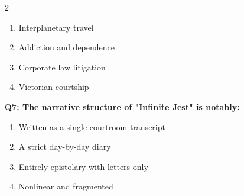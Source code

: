 \documentclass[10pt]{article}
\begin{document}
\begin{multicols}{2}
\begin{enumerate}[label=\arabic*.]
\item Interplanetary travel
\item Addiction and dependence
\item Corporate law litigation
\item Victorian courtship
\end{enumerate}
\textbf{Q7: The narrative structure of "Infinite Jest" is notably:}

\begin{enumerate}[label=\arabic*.]
\item Written as a single courtroom transcript
\item A strict day-by-day diary
\item Entirely epistolary with letters only
\item Nonlinear and fragmented
\end{enumerate}
\end{multicols}

\newpage
\end{document}
